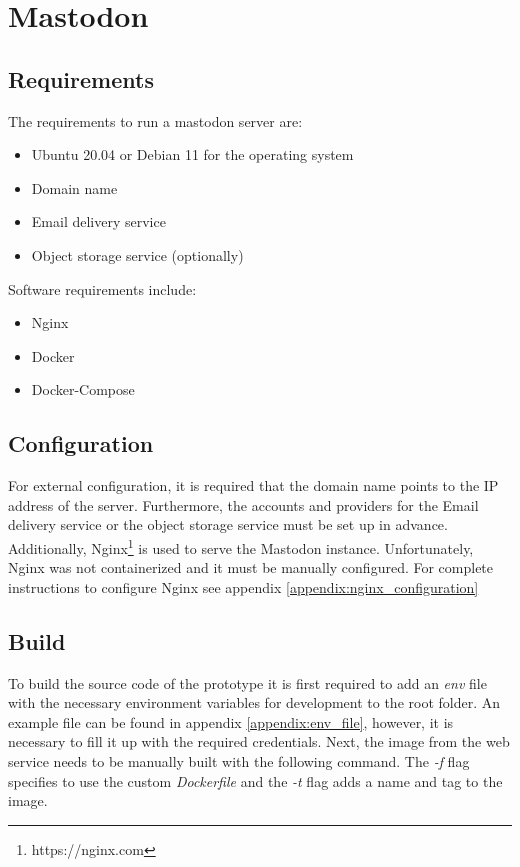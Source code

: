 \section{Mastodon}



\subsection{Requirements}

The requirements to run a mastodon server are:
\begin{itemize}
  \item Ubuntu 20.04 or Debian 11 for the operating system
  \item Domain name
  \item Email delivery service
  \item Object storage service (optionally)
\end{itemize}

Software requirements include: 
\begin{itemize}
  \item Nginx
  \item Docker
  \item Docker-Compose
\end{itemize}


\subsection{Configuration}

For external configuration, it is required that the domain name points to the IP address of the server. Furthermore, the accounts and providers for the Email delivery service or the object storage service must be set up in advance. 
Additionally, Nginx\footnote{https://nginx.com} is used to serve the Mastodon instance. Unfortunately, Nginx was not containerized and it must be manually configured. For complete instructions to configure Nginx see appendix \ref{appendix:nginx_configuration} 


\subsection{Build}

To build the source code of the prototype it is first required to add an \emph{env} file with the necessary environment variables for development to the root folder. An example file can be found in appendix \ref{appendix:env_file}, however, it is necessary to fill it up with the required credentials. Next, the image from the web service needs to be manually built with the following command. The \emph{-f} flag specifies to use the custom \emph{Dockerfile} and the \emph{-t} flag adds a name and tag to the image. 
  
